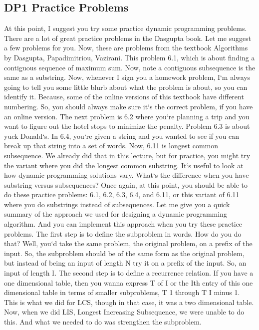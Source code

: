 \subsection{DP1  Practice Problems}
At this point, I suggest you try some practice dynamic programming problems.
There are a lot of great practice problems in the Dasgupta book.
Let me suggest a few problems for you.
Now, these are problems from the textbook Algorithms by Dasgupta, Papadimitriou, Vazirani.
This problem 6.1, which is about finding a contiguous sequence of maximum sum.
Now, note a contiguous subsequence is the same as a substring.
Now, whenever I sign you a homework problem, I`m always going to tell you some little blurb about what the problem is about, so you can identify it.
Because, some of the online versions of this textbook have different numbering.
So, you should always make sure it`s the correct problem, if you have an online version.
The next problem is 6.2 where you`re planning a trip and you want to figure out the hotel stops to minimize the penalty.
Problem 6.3 is about yuck Donald`s.
In 6.4, you`re given a string and you wanted to see if you can break up that string into a set of words.
Now, 6.11 is longest common subsequence.
We already did that in this lecture, but for practice, you might try the variant where you did the longest common substring.
It`s useful to look at how dynamic programming solutions vary.
What`s the difference when you have substring versus subsequences? Once again, at this point, you should be able to do these practice problems: 6.1, 6.2, 6.3, 6.4, and 6.11, or this variant of 6.11 where you do substrings instead of subsequences.
Let me give you a quick summary of the approach we used for designing a dynamic programming algorithm.
And you can implement this approach when you try these practice problems.
The first step is to define the subproblem in words.
How do you do that? Well, you`d take the same problem, the original problem, on a prefix of the input.
So, the subproblem should be of the same form as the original problem, but instead of being an input of length N try it on a prefix of the input.
So, an input of length I\@.
The second step is to define a recurrence relation.
If you have a one dimensional table, then you wanna express T of I or the Ith entry of this one dimensional table in terms of smaller subproblems, T 1 through T I minus 1.
This is what we did for LCS, though in that case, it was a two dimensional table.
Now, when we did LIS, Longest Increasing Subsequence, we were unable to do this.
And what we needed to do was strengthen the subproblem.
